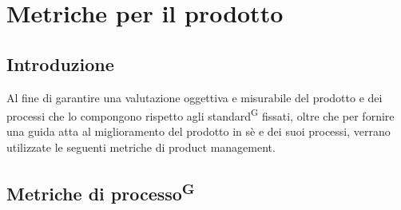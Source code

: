 \documentclass[8pt]{article}
\newcommand{\glossterm}[1]{#1\textsuperscript{G}} %
\begin{document}
\section{Metriche per il prodotto} \label{sec:metriche_prodotto}
\subsection{Introduzione}
Al fine di garantire una valutazione oggettiva e misurabile del prodotto e dei processi che lo compongono rispetto agli \glossterm{standard} fissati, oltre che per fornire una guida atta al miglioramento del prodotto in sè e dei suoi processi, verrano utilizzate le seguenti metriche di product management. 

\subsection{Metriche di \glossterm{processo}}
\end{document}
